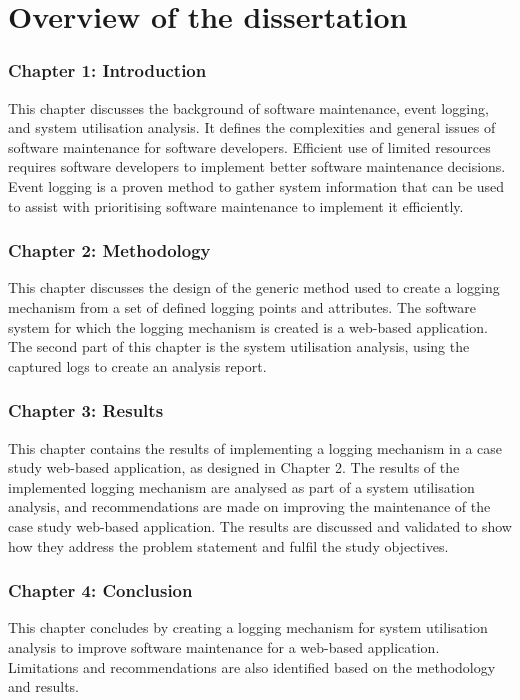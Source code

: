\section{Overview of the dissertation}
\subsubsection{Chapter 1: Introduction}
This chapter discusses the background of software maintenance, event logging, and system utilisation analysis. It defines the complexities and general issues of software maintenance for software developers. Efficient use of limited resources requires software developers to implement better software maintenance decisions. Event logging is a proven method to gather system information that can be used to assist with prioritising software maintenance to implement it efficiently.

\subsubsection{Chapter 2: Methodology}
This chapter discusses the design of the generic method used to create a logging mechanism from a set of defined logging points and attributes. The software system for which the logging mechanism is created is a web-based application. The second part of this chapter is the system utilisation analysis, using the captured logs to create an analysis report.

\subsubsection{Chapter 3: Results}
This chapter contains the results of implementing a logging mechanism in a case study web-based application, as designed in Chapter 2. The results of the implemented logging mechanism are analysed as part of a system utilisation analysis, and recommendations are made on improving the maintenance of the case study web-based application. The results are discussed and validated to show how they address the problem statement and fulfil the study objectives.

\subsubsection{Chapter 4: Conclusion}
This chapter concludes by creating a logging mechanism for system utilisation analysis to improve software maintenance for a web-based application. Limitations and recommendations are also identified based on the methodology and results.
